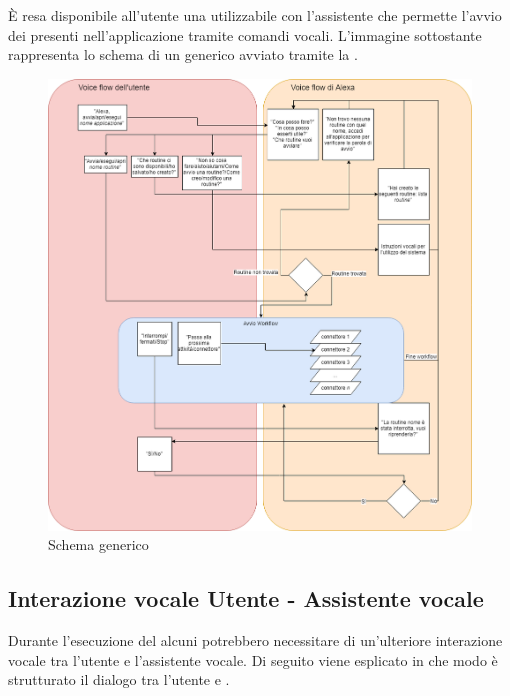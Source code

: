 \clearpage
\section{}
È resa disponibile all'utente una  utilizzabile con l'assistente   che permette l'avvio dei  presenti nell'applicazione tramite comandi vocali.
L'immagine sottostante rappresenta lo schema di un  generico avviato tramite la .
\begin{figure}[H]
	\centering
	\includegraphics[width=15cm,keepaspectratio]{../includes/pics/voice_flow_alexa_utente.png}
	\caption{\label{fig:mission}Schema  generico}
\end{figure}
\subsection{Interazione vocale Utente - Assistente vocale}
Durante l'esecuzione del  alcuni  potrebbero necessitare di un'ulteriore interazione vocale tra l'utente e l'assistente vocale. Di seguito viene esplicato in che modo è strutturato il dialogo tra l'utente e  .
